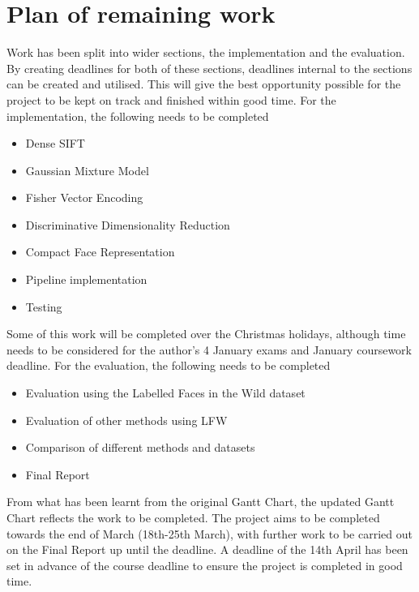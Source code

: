 \documentclass[12pt, a4paper]{article}
\begin{document}
\section{Plan of remaining work}
Work has been split into wider sections, the implementation and the evaluation. By creating deadlines for both of these sections, deadlines internal to the sections can be created and utilised. This will give the best opportunity possible for the project to be kept on track and finished within good time.
For the implementation, the following needs to be completed
\begin{itemize}
\item Dense SIFT 
\item Gaussian Mixture Model 
\item Fisher Vector Encoding 
\item Discriminative Dimensionality Reduction 
\item Compact Face Representation 
\item Pipeline implementation
\item Testing
\end{itemize}

Some of this work will be completed over the Christmas holidays, although time needs to be considered for the author’s 4 January exams and January coursework deadline. 
For the evaluation, the following needs to be completed 
\begin{itemize}
\item Evaluation using the Labelled Faces in the Wild dataset
\item Evaluation of other methods using LFW
\item Comparison of different methods and datasets
\item Final Report
\end{itemize}
From what has been learnt from the original Gantt Chart, the updated Gantt Chart reflects the work to be completed. The project aims to be completed towards the end of March (18th-25th March), with further work to be carried out on the Final Report up until the deadline. A deadline of the 14th April has been set in advance of the course deadline to ensure the project is completed in good time.
 
        \newpage
 
\end{document}
